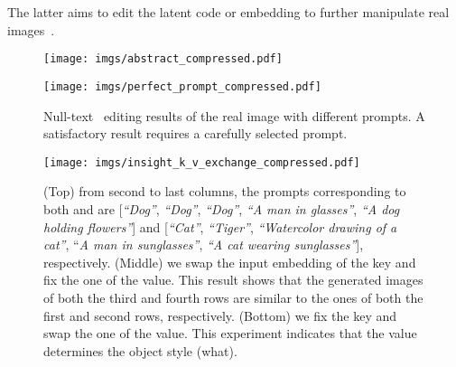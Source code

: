 \documentclass[twocolumn]{svjour3}          \smartqed  \usepackage{graphicx}
\begin{document}
The latter aims to edit the latent code or embedding to further manipulate real images~\citep{Kawar2022ImagicTR,meng2021sdedit,cao2023masactrl,zhang2023adding,couairon2022diffedit}.



\begin{figure*}
\centering
        \texttt{[image: imgs/abstract\_compressed.pdf]}    \vspace{-6mm}
        \label{fig:teaser}
\end{figure*}


\begin{figure*}[t]
    \centering
\texttt{[image: imgs/perfect\_prompt\_compressed.pdf]}\vspace{-2mm}
        \caption{Null-text~\citep{mokady2022null} editing results of the real image with different prompts. A satisfactory result requires a carefully selected  prompt.}
    \label{fig:perfect_prompt}\vspace{-2mm}
\end{figure*}

\begin{figure}[t]
    \centering
\texttt{[image: imgs/insight\_k\_v\_exchange\_compressed.pdf]}\vspace{-2mm}
        \caption{(Top) from second to last columns,  the prompts corresponding to both  and   are [\textit{“Dog”}, \textit{“Dog”}, \textit{“Dog”}, \textit{“A man in glasses”}, \textit{“A dog holding flowers”}] and [\textit{“Cat”}, \textit{“Tiger”}, \textit{“Watercolor drawing of a cat”}, “\textit{A man in sunglasses”}, \textit{“A cat wearing sunglasses”}], respectively. (Middle) we swap the input embedding of the key and fix the one of the value. This result shows that the generated images of both the third and fourth rows are similar to the ones of both the first and second rows, respectively. (Bottom) we fix the key and swap the one of the value. This experiment indicates that the value determines the object style (what). }
    \label{fig:k_v_exchange}\vspace{-2mm}
\end{figure}
\end{document}
